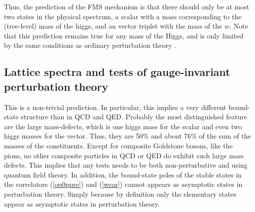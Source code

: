 \documentclass[final,12pt,3p,longtitle]{elsarticle}
\newcommand*{\pref}[1]{(\ref{#1})}
\newcommand*{\1}{1\!\!\!\bot}
\begin{document}
Thus, the prediction of the FMS mechanism is that there should only be at most two states in the physical spectrum, a scalar with a mass corresponding to the (tree-level) mass of the higgs, and an vector triplet with the mass of the $w$. Note that this prediction remains true for any mass of the Higgs, and is only limited by the same conditions as ordinary perturbation theory \cite{Bohm:2001yx}.

\subsection{Lattice spectra and tests of gauge-invariant perturbation theory}\label{ss:latgipt}

This is a non-trivial prediction. In particular, this implies a very different bound-state structure than in QCD and QED. Probably the most distinguished feature are the large mass-defects, which is one higgs mass for the scalar and even two higgs masses for the vector. Thus, they are 50\% and about 76\% of the sum of the masses of the constituents. Except for composite Goldstone bosons, like the pions, no other composite particles in QCD or QED do exhibit such large mass defects. This implies that any tests needs to be both non-perturbative and using quantum field theory. In addition, the bound-state poles of the stable states in the correlators \pref{op0ppre} and \pref{wcor} cannot appears as asymptotic states in perturbation theory. Simply because by definition only the elementary states appear as asymptotic states in perturbation theory.
\end{document}
